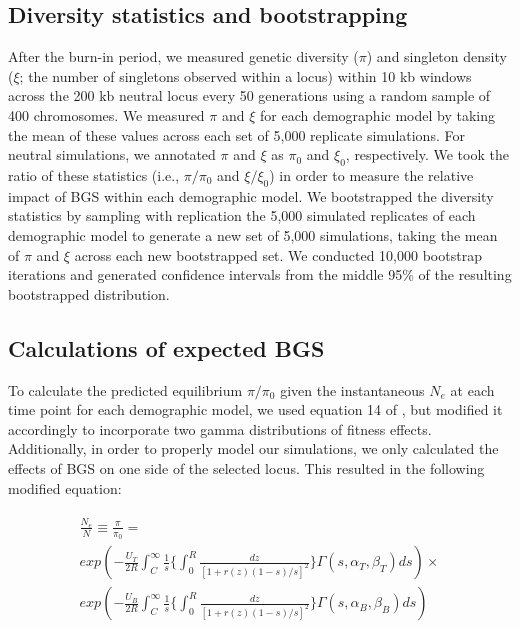 \documentclass[9pt,twocolumn,twoside]{rilabRxiv}
\begin{document}
\subsection{Diversity statistics and bootstrapping}

After the burn-in period, we measured genetic diversity ($\pi$) and singleton density ($\xi$; the number of singletons observed within a locus) within 10 kb windows across the 200 kb neutral locus every 50 generations using a random sample of 400 chromosomes.
We measured $\pi$ and $\xi$ for each demographic model by taking the mean of these values across each set of 5,000 replicate simulations.
For neutral simulations, we annotated $\pi$ and $\xi$ as $\pi_0$ and $\xi_0$, respectively.
We took the ratio of these statistics (i.e., $\pi/\pi_0$ and $\xi/\xi_0$) in order to measure the relative impact of BGS within each demographic model.
We bootstrapped the diversity statistics by sampling with replication the 5,000 simulated replicates of each demographic model to generate a new set of 5,000 simulations, taking the mean of $\pi$ and $\xi$ across each new bootstrapped set.
We conducted 10,000 bootstrap iterations and generated confidence intervals from the middle 95\% of the resulting bootstrapped distribution.

\subsection{Calculations of expected BGS}

To calculate the predicted equilibrium $\pi/\pi_0$ given the instantaneous $N_e$ at each time point for each demographic model, we used equation 14 of \citet{nordborg1996effect}, but modified it accordingly to incorporate two gamma distributions of fitness effects.
Additionally, in order to properly model our simulations, we only calculated the effects of BGS on one side of the selected locus.
This resulted in the following modified equation:


\begin{eqnarray*}
\begin{aligned}
\frac{N_e}{N}\equiv\frac{\pi}{\pi_0}= \\
exp\left( -\frac{U_T}{2R}\int^{\infty}_C\frac{1}{s}\bigg\{\int_0^R\frac{dz}{[1+r(z)(1-s)/s]^2}\bigg\}\Gamma(s,\alpha_T,\beta_T)ds \right)\times \\
    exp\left( -\frac{U_B}{2R}\int^{\infty}_C\frac{1}{s}\bigg\{\int_0^R\frac{dz}{[1+r(z)(1-s)/s]^2}\bigg\}\Gamma(s,\alpha_B,\beta_B)ds \right)
    \end{aligned}
\end{eqnarray*}
\end{document}
